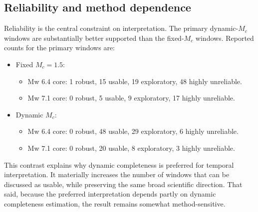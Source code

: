 \documentclass[11pt]{article}
\begin{document}
\subsection{Reliability and method dependence}
Reliability is the central constraint on interpretation. The primary dynamic-$M_c$ windows are substantially better supported than the fixed-$M_c$ windows. Reported counts for the primary windows are:
\begin{itemize}[leftmargin=1.5em]
    \item Fixed $M_c=1.5$:
    \begin{itemize}
        \item Mw 6.4 core: 1 robust, 15 usable, 19 exploratory, 48 highly unreliable.
        \item Mw 7.1 core: 0 robust, 5 usable, 9 exploratory, 17 highly unreliable.
    \end{itemize}
    \item Dynamic $M_c$:
    \begin{itemize}
        \item Mw 6.4 core: 0 robust, 48 usable, 29 exploratory, 6 highly unreliable.
        \item Mw 7.1 core: 0 robust, 20 usable, 8 exploratory, 3 highly unreliable.
    \end{itemize}
\end{itemize}
This contrast explains why dynamic completeness is preferred for temporal interpretation. It materially increases the number of windows that can be discussed as usable, while preserving the same broad scientific direction. That said, because the preferred interpretation depends partly on dynamic completeness estimation, the result remains somewhat method-sensitive.
\end{document}
